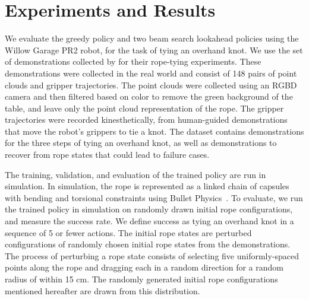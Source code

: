 \section{Experiments and Results}
\label{sec:experiments}




We evaluate the greedy policy and two beam search lookahead policies using the Willow Garage PR2 robot, for the task of tying an overhand knot.
We use the set of demonstrations collected by \citet{Schulmanetal_ISRR2013} for their rope-tying experiments.
These demonstrations were collected in the real world and consist of 148 pairs of point clouds and gripper trajectories.
The point clouds were collected using an RGBD camera and then filtered based on color to remove the green background of the table, and leave only the point cloud representation of the rope.
The gripper trajectories were recorded kinesthetically, from human-guided demonstrations that move the robot's grippers to tie a knot.
The dataset contains demonstrations for the three steps of tying an overhand knot, as well as demonstrations to recover from rope states that could lead to failure cases.

The training, validation, and evaluation of the trained policy are run in simulation.
In simulation, the rope is represented as a linked chain of capsules with bending and torsional constraints using Bullet Physics~\cite{Bullet_Physics}.
To evaluate, we run the trained policy in simulation on randomly drawn initial rope configurations, and measure the success rate. We define success as tying an overhand knot in a sequence of 5 or fewer actions.
The initial rope states are perturbed configurations of randomly chosen initial rope states from the demonstrations.
The process of perturbing a rope state consists of selecting five uniformly-spaced points along the rope and dragging each in a random direction for a random radius of within 15 cm.
The randomly generated initial rope configurations mentioned hereafter are drawn from this distribution.

